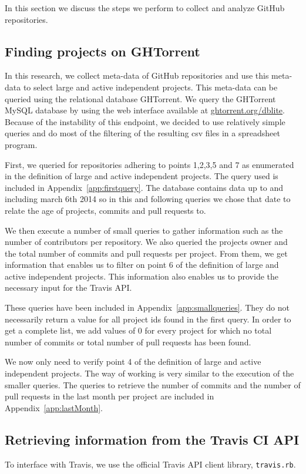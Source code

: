 In this section we discuss the steps we perform to collect and analyze GitHub repositories.

\subsection{Finding projects on GHTorrent}
In this research, we collect meta-data of GitHub repositories and use this meta-data to select large and active independent projects.
This meta-data can be queried using the relational database GHTorrent. \cite{ghtorrent}
We query the GHTorrent MySQL database by using the web interface available at \url{ghtorrent.org/dblite}. 
Because of the instability of this endpoint, we decided to use relatively simple queries and do most of the filtering of the resulting csv files in a spreadsheet program.

First, we queried for repositories adhering to points 1,2,3,5 and 7 as enumerated in the definition of large and active independent projects.
The query used is included in Appendix~\ref{app:firstquery}.
The database contains data up to and including march 6th 2014 so in this and following queries we chose that date to relate the age of projects, commits and pull requests to.

We then execute a number of small queries to gather information such as the number of contributors per repository. 
We also queried the projects owner and the total number of commits and pull requests per project. 
From them, we get information that enables us to filter on point 6 of the definition of large and active independent projects. 
This information also enables us to provide the necessary input for the Travis API.

These queries have been included in Appendix~\ref{app:smallqueries}.
They do not necessarily return a value for all project ids found in the first query.
In order to get a complete list, we add values of 0 for every project for which no total number of commits or total number of pull requests has been found.

We now only need to verify point 4 of the definition of large and active independent projects. 
The way of working is very similar to the execution of the smaller queries. 
The queries to retrieve the number of commits and the number of pull requests in the last month per project are included in Appendix~\ref{app:lastMonth}.

\subsection{Retrieving information from the Travis CI API}
To interface with Travis, we use the official Travis API client library, \texttt{travis.rb}.

